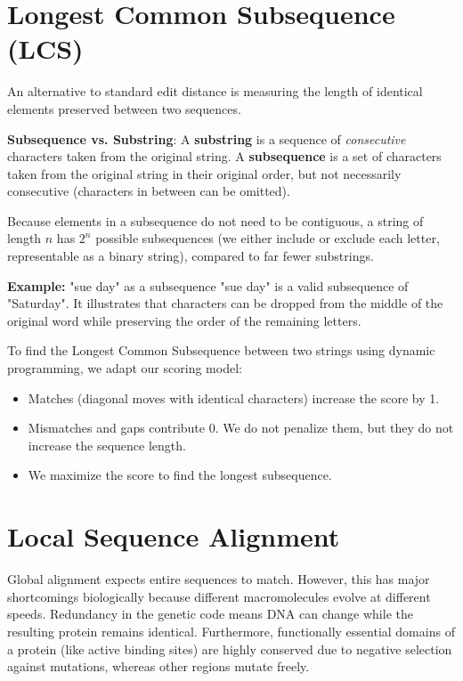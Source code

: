 \documentclass[11pt,a4paper]{article}
\begin{document}
\section{Longest Common Subsequence (LCS)}
An alternative to standard edit distance is measuring the length of identical elements preserved between two sequences.

\begin{important}
    \textbf{Subsequence vs. Substring}: 
    A \textbf{substring} is a sequence of \textit{consecutive} characters taken from the original string. 
    A \textbf{subsequence} is a set of characters taken from the original string in their original order, but not necessarily consecutive (characters in between can be omitted).
\end{important}

Because elements in a subsequence do not need to be contiguous, a string of length \( n \) has \( 2^n \) possible subsequences (we either include or exclude each letter, representable as a binary string), compared to far fewer substrings.

\textbf{Example:} "sue day" as a subsequence
"sue day" is a valid subsequence of "Saturday". It illustrates that characters can be dropped from the middle of the original word while preserving the order of the remaining letters.

To find the Longest Common Subsequence between two strings using dynamic programming, we adapt our scoring model:
\begin{itemize}
    \item Matches (diagonal moves with identical characters) increase the score by 1.
    \item Mismatches and gaps contribute 0. We do not penalize them, but they do not increase the sequence length.
    \item We maximize the score to find the longest subsequence.
\end{itemize}

\section{Local Sequence Alignment}
Global alignment expects entire sequences to match. However, this has major shortcomings biologically because different macromolecules evolve at different speeds. Redundancy in the genetic code means DNA can change while the resulting protein remains identical. Furthermore, functionally essential domains of a protein (like active binding sites) are highly conserved due to negative selection against mutations, whereas other regions mutate freely.
\end{document}
